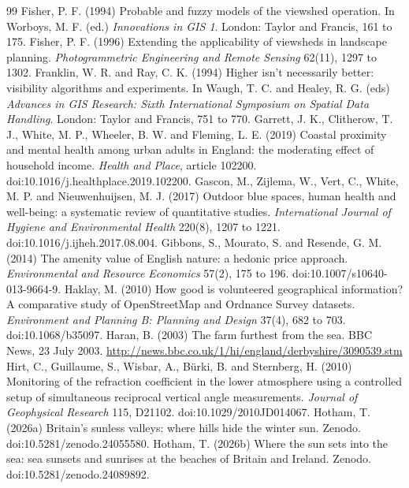 \documentclass[11pt,a4paper]{article}
\begin{document}
\begin{thebibliography}{99}
 Fisher, P. F. (1994) Probable and fuzzy models of the viewshed operation. In Worboys, M. F. (ed.) \textit{Innovations in GIS 1}. London: Taylor and Francis, 161 to 175.
 Fisher, P. F. (1996) Extending the applicability of viewsheds in landscape planning. \textit{Photogrammetric Engineering and Remote Sensing} 62(11), 1297 to 1302.
 Franklin, W. R. and Ray, C. K. (1994) Higher isn't necessarily better: visibility algorithms and experiments. In Waugh, T. C. and Healey, R. G. (eds) \textit{Advances in GIS Research: Sixth International Symposium on Spatial Data Handling}. London: Taylor and Francis, 751 to 770.
 Garrett, J. K., Clitherow, T. J., White, M. P., Wheeler, B. W. and Fleming, L. E. (2019) Coastal proximity and mental health among urban adults in England: the moderating effect of household income. \textit{Health and Place}, article 102200. doi:10.1016/j.healthplace.2019.102200.
 Gascon, M., Zijlema, W., Vert, C., White, M. P. and Nieuwenhuijsen, M. J. (2017) Outdoor blue spaces, human health and well-being: a systematic review of quantitative studies. \textit{International Journal of Hygiene and Environmental Health} 220(8), 1207 to 1221. doi:10.1016/j.ijheh.2017.08.004.
 Gibbons, S., Mourato, S. and Resende, G. M. (2014) The amenity value of English nature: a hedonic price approach. \textit{Environmental and Resource Economics} 57(2), 175 to 196. doi:10.1007/s10640-013-9664-9.
 Haklay, M. (2010) How good is volunteered geographical information? A comparative study of OpenStreetMap and Ordnance Survey datasets. \textit{Environment and Planning B: Planning and Design} 37(4), 682 to 703. doi:10.1068/b35097.
 Haran, B. (2003) The farm furthest from the sea. BBC News, 23 July 2003. \url{http://news.bbc.co.uk/1/hi/england/derbyshire/3090539.stm}
 Hirt, C., Guillaume, S., Wisbar, A., B\"urki, B. and Sternberg, H. (2010) Monitoring of the refraction coefficient in the lower atmosphere using a controlled setup of simultaneous reciprocal vertical angle measurements. \textit{Journal of Geophysical Research} 115, D21102. doi:10.1029/2010JD014067.
 Hotham, T. (2026a) Britain's sunless valleys: where hills hide the winter sun. Zenodo. doi:10.5281/zenodo.24055580.
 Hotham, T. (2026b) Where the sun sets into the sea: sea sunsets and sunrises at the beaches of Britain and Ireland. Zenodo. doi:10.5281/zenodo.24089892.

\end{thebibliography}
\end{document}

